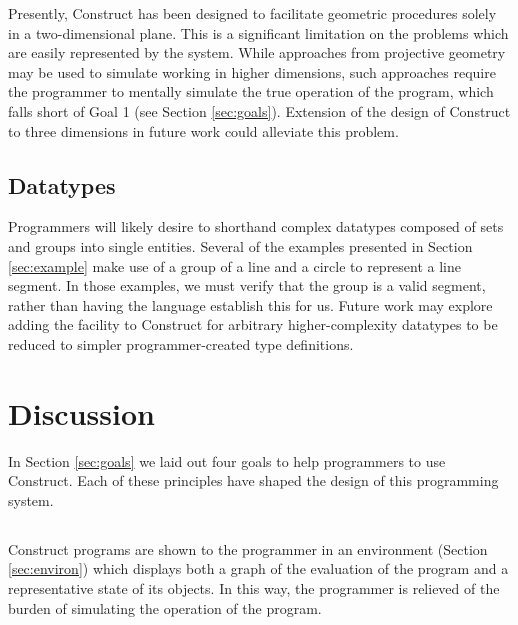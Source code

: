 \documentclass[twoside,openright,11pt]{report}
\begin{document}
Presently, Construct has been designed to facilitate geometric procedures solely in a two-dimensional plane. 
This is a significant limitation on the problems which are easily represented by the system. 
While approaches from projective geometry may be used to simulate working in higher dimensions, such approaches require the programmer to mentally simulate the true operation of the program, which falls short of Goal 1 (see Section \ref{sec:goals}).
Extension of the design of Construct to three dimensions in future work could alleviate this problem.

\subsection{Datatypes}

Programmers will likely desire to shorthand complex datatypes composed of sets and groups into single entities. 
Several of the examples presented in Section \ref{sec:example} make use of a group of a line and a circle to represent a line segment. 
In those examples, we must verify that the group is a valid segment, rather than having the language establish this for us.
Future work may explore adding the facility to Construct for arbitrary higher-complexity datatypes to be reduced to simpler programmer-created type definitions.

\section{Discussion}
\label{sec:discuss}

In Section \ref{sec:goals} we laid out four goals to help programmers to use Construct. Each of these principles have shaped the design of this programming system.

\subsection{\constructgoalsclear}

Construct programs are shown to the programmer in an environment (Section \ref{sec:environ}) which displays both a graph of the evaluation of the program and a representative state of its objects.
In this way, the programmer is relieved of the burden of simulating the operation of the program.

\subsection{\constructgoalsnative}
\end{document}

